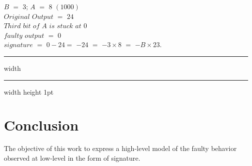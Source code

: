 $B$ $=$ $3$;  $A$ $=$ $8$ $(1000)$ \\
$Original$ $Output$ $=$ $24$ \\
$Third$ $bit$ $of$ $A$ $is$ $stuck$ $at$ $0$\\\; 
$faulty$ $output$ $=$ $0$ \\ 
$signature$ $=$ $ 0 - 24 $$=$ $-24$ $=$ $-3\times 8$ $=$ $-B \times 23$.


\hrule height 2pt width \hsize \kern 1pt \hrule width \hsize height 1pt





\section{Conclusion}
The objective of this work to express a high-level model of the faulty behavior observed at low-level in the form of signature. 